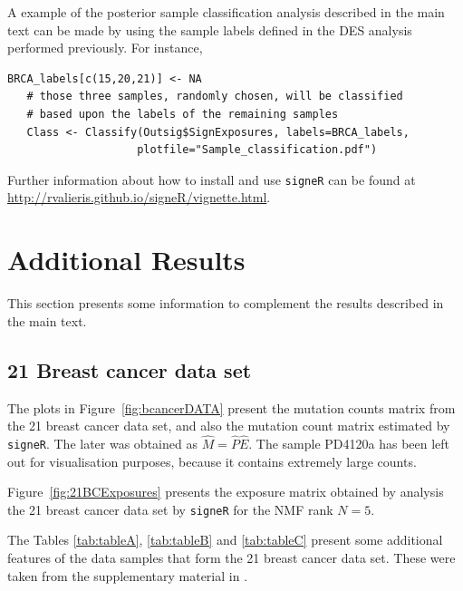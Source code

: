 \documentclass[11pt]{amsart}
\theoremstyle{definition}
\begin{document}
A example of the posterior sample classification analysis described in
the main text can be made by using the sample labels defined in the
DES analysis performed previously. For instance,
\begin{lstlisting}[]
   BRCA_labels[c(15,20,21)] <- NA 
   # those three samples, randomly chosen, will be classified
   # based upon the labels of the remaining samples
   Class <- Classify(Outsig$SignExposures, labels=BRCA_labels,
                    plotfile="Sample_classification.pdf")
\end{lstlisting}
Further information about how to install and use \texttt{signeR} can
be found at \\ 
\indent\indent\url{http://rvalieris.github.io/signeR/vignette.html}.

\section{Additional Results}
This section presents some information to complement the results
described in the main text. 

\subsection{21 Breast cancer data set}
The plots in Figure~\ref{fig:bcancerDATA} present the mutation
counts matrix from the 21 breast cancer data set, and also the
mutation count matrix estimated by \texttt{signeR}. The later was
obtained as $\widehat M = \widehat P\widehat E$. The sample
PD4120a has been left out for visualisation purposes, because it
contains extremely large counts.


Figure~\ref{fig:21BCExposures} presents the exposure matrix obtained
by analysis the 21 breast cancer data set by \texttt{signeR} for the
NMF rank $N=5$.


The Tables \ref{tab:tableA}, \ref{tab:tableB} and \ref{tab:tableC}
present some additional features of the data samples that form the 21
breast cancer data set. These were taken from the supplementary
material in \cite{NCellFull}. 
\end{document}
